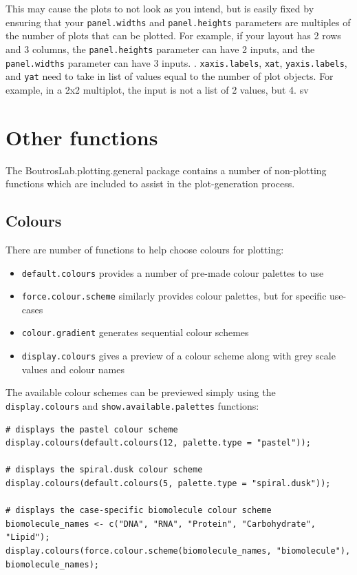 \documentclass[letterpaper]{report}\usepackage[]{graphicx}\usepackage[]{color}
\begin{document}
This may cause the plots to not look as you intend, but is easily fixed by ensuring that your \texttt{panel.widths} and \texttt{panel.heights} parameters are multiples of the number of plots that can be plotted. For example, if your layout has 2 rows and 3 columns, the \texttt{panel.heights} parameter can have 2 inputs, and the \texttt{panel.widths} parameter can have 3 inputs.
\newline
{}. \texttt{xaxis.labels}, \texttt{xat}, \texttt{yaxis.labels}, and \texttt{yat} need to take in list of values equal to the number of plot objects. For example, in a 2x2 multiplot, the input is not a list of 2 values, but 4.
sv 
\section{Other functions}
The BoutrosLab.plotting.general package contains a number of non-plotting functions which are included to assist in the plot-generation process. 

\subsection{Colours}
There are number of functions to help choose colours for plotting:
\begin{itemize}
\item \texttt{default.colours} provides a number of pre-made colour palettes to use
\item \texttt{force.colour.scheme} similarly provides colour palettes, but for specific use-cases
\item \texttt{colour.gradient} generates sequential colour schemes
\item \texttt{display.colours} gives a preview of a colour scheme along with grey scale values and colour names
\end{itemize}

The available colour schemes can be previewed simply using the \verb|display.colours| and \verb|show.available.palettes| functions:

\begin{verbatim}
# displays the pastel colour scheme
display.colours(default.colours(12, palette.type = "pastel"));

# displays the spiral.dusk colour scheme
display.colours(default.colours(5, palette.type = "spiral.dusk"));

# displays the case-specific biomolecule colour scheme
biomolecule_names <- c("DNA", "RNA", "Protein", "Carbohydrate", "Lipid");
display.colours(force.colour.scheme(biomolecule_names, "biomolecule"), biomolecule_names);
\end{verbatim}
\end{document}

